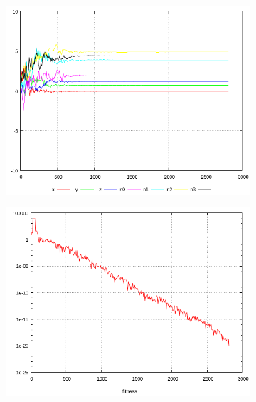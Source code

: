 \begin{figure} [h]
         \centering
         \caption{ Darstellung der von Gnuplot erzeugten Plots. Ausgewählt wurden zufällig 2 aus 50 durchgeführten Lösungen. Pro Reihe ist jeweils das Ergebnis einer Lösung dargestellt. Auf Basis dieser Plots kann eine Beurteilung der Modellgüte und eine Untersuchung der Einflüsse durch Optimierungsparameter durchgeführt werden. Diese werden in der kommenden Woche durchgeführt. }
%         
         \begin{subfigure}[t]{0.34\textwidth}
                 \centering
                 \includegraphics[width=\textwidth]{common/img/objectVar0.png}
                 \label{fig:ResA0}\textit{}
         \end{subfigure}
%         
\qquad
         \begin{subfigure}[t]{0.34\textwidth}
                 \centering
                 \includegraphics[width=\textwidth]{common/img/fitness0.png}

\end{subfigure}
\end{figure}
